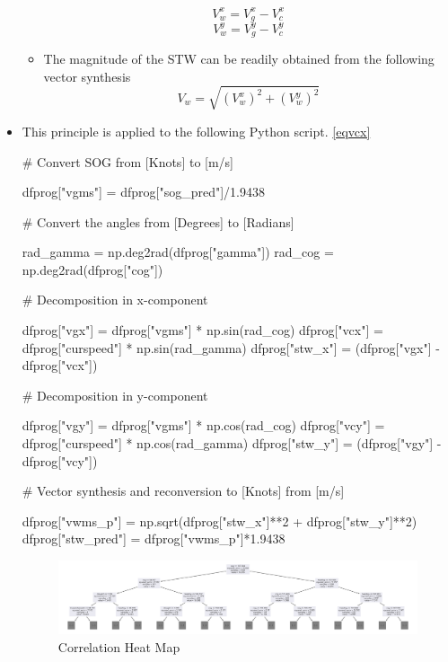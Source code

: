 \begin{itemize}
\begin{itemize}
        \begin{equation}
            V_{w}^x = V_{g}^x - V_{c}^x    
        \end{equation}
        \begin{equation}
            V_{w}^y = V_{g}^y - V_{c}^y 
        \end{equation}
        \item The magnitude of the STW can be readily obtained from the following vector synthesis
        \begin{equation}
            V_w = \sqrt{(V_{w}^x)^2 + (V_{w}^y)^2} 
        \end{equation}
    \end{itemize}
    \newpage

    \item This principle is applied to the following Python script. \ref{eqvcx}

\begin{python}
       
        # Convert SOG from [Knots] to [m/s]
    
        dfprog["vgms"] = dfprog["sog_pred"]/1.9438
        
        # Convert the angles from [Degrees] to [Radians]

        rad_gamma = np.deg2rad(dfprog["gamma"])
        rad_cog = np.deg2rad(dfprog["cog"])

        # Decomposition in x-component

        dfprog["vgx"] = dfprog["vgms"] * np.sin(rad_cog)
        dfprog["vcx"] = dfprog["curspeed"] * np.sin(rad_gamma)
        dfprog["stw_x"] = (dfprog["vgx"] - dfprog["vcx"])

        # Decomposition in y-component

        dfprog["vgy"] = dfprog["vgms"] * np.cos(rad_cog)
        dfprog["vcy"] = dfprog["curspeed"] * np.cos(rad_gamma)
        dfprog["stw_y"] = (dfprog["vgy"] - dfprog["vcy"])

        # Vector synthesis and reconversion to [Knots] from [m/s]

        dfprog["vwms_p"] = np.sqrt(dfprog["stw_x"]**2 + dfprog["stw_y"]**2)
        dfprog["stw_pred"] = dfprog["vwms_p"]*1.9438  

    \end{python}
\newpage

\begin{figure}
    \includegraphics[width=\linewidth,height=\textheight,keepaspectratio]{02_figures/rfrftree.png}
    \caption{Correlation Heat Map}
    \label{fig:Random Forest Regression Tree}
\end{figure}


\end{itemize}

